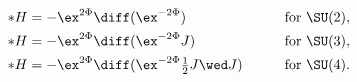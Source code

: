 \begin{equation}
\label{sunflux}
\begin{aligned}
   *H &= -\ex^{2\Phi} \diff (\ex^{-2\Phi}) 
      && \qquad \text{for $\SU(2)$} , \\ 
   *H &= -\ex^{2\Phi} \diff ( \ex^{-2\Phi} J ) 
      && \qquad \text{for $\SU(3)$} , \\
   *H &= -\ex^{2\Phi}\diff ( \ex^{-2\Phi}\tfrac{1}{2}J\wed J )
      && \qquad \text{for $\SU(4)$} .
\end{aligned}
\end{equation}

